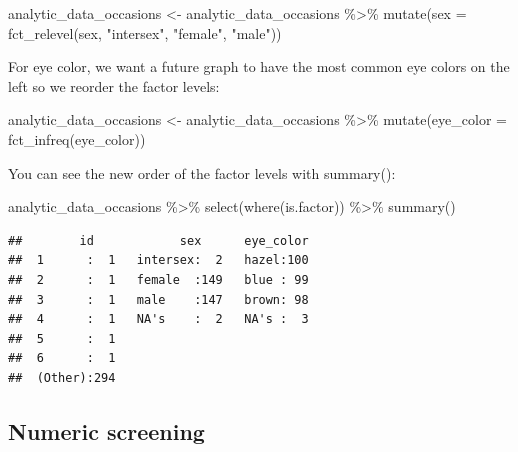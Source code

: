 \documentclass[
]{krantz}
\makeatletter
\newenvironment{Shaded}{\begin{snugshade}}{\end{snugshade}}
\newcommand{\AttributeTok}[1]{\textcolor[rgb]{0.61,0.61,0.61}{#1}}
\newcommand{\FunctionTok}[1]{\textcolor[rgb]{0,0,0}{#1}}
\newcommand{\NormalTok}[1]{#1}
\newcommand{\OtherTok}[1]{\textcolor[rgb]{0.37,0.37,0.37}{#1}}
\newcommand{\SpecialCharTok}[1]{\textcolor[rgb]{0,0,0}{#1}}
\newcommand{\StringTok}[1]{\textcolor[rgb]{0.5,0.5,0.5}{#1}}
\newenvironment{kframe}{%
\medskip{}
\setlength{\fboxsep}{.8em}
 \def\at@end@of@kframe{}%
 \ifinner\ifhmode%
  \def\at@end@of@kframe{\end{minipage}}%
  \begin{minipage}{\columnwidth}%
 \fi\fi%
 \def\FrameCommand##1{\hskip\@totalleftmargin \hskip-\fboxsep
 \colorbox{shadecolor}{##1}\hskip-\fboxsep
     \hskip-\linewidth \hskip-\@totalleftmargin \hskip\columnwidth}%
 \MakeFramed {\advance\hsize-\width
   \@totalleftmargin\z@ \linewidth\hsize
   \@setminipage}}%
 {\par\unskip\endMakeFramed%
 \at@end@of@kframe}
\renewenvironment{Shaded}{\begin{kframe}}{\end{kframe}}
\makeatother
\begin{document}
\begin{Shaded}
\begin{Highlighting}[]
\NormalTok{analytic\_data\_occasions }\OtherTok{\textless{}{-}}\NormalTok{ analytic\_data\_occasions }\SpecialCharTok{\%\textgreater{}\%}
  \FunctionTok{mutate}\NormalTok{(}\AttributeTok{sex =} \FunctionTok{fct\_relevel}\NormalTok{(sex,}
                           \StringTok{"intersex"}\NormalTok{,}
                           \StringTok{"female"}\NormalTok{,}
                           \StringTok{"male"}\NormalTok{))}
\end{Highlighting}
\end{Shaded}

For eye color, we want a future graph to have the most common eye colors on the left so we reorder the factor levels:

\begin{Shaded}
\begin{Highlighting}[]
\NormalTok{analytic\_data\_occasions }\OtherTok{\textless{}{-}}\NormalTok{ analytic\_data\_occasions }\SpecialCharTok{\%\textgreater{}\%}
  \FunctionTok{mutate}\NormalTok{(}\AttributeTok{eye\_color =} \FunctionTok{fct\_infreq}\NormalTok{(eye\_color))}
\end{Highlighting}
\end{Shaded}

You can see the new order of the factor levels with summary():

\begin{Shaded}
\begin{Highlighting}[]
\NormalTok{analytic\_data\_occasions }\SpecialCharTok{\%\textgreater{}\%}
  \FunctionTok{select}\NormalTok{(}\FunctionTok{where}\NormalTok{(is.factor)) }\SpecialCharTok{\%\textgreater{}\%}
  \FunctionTok{summary}\NormalTok{()}
\end{Highlighting}
\end{Shaded}

\begin{verbatim}
##        id            sex      eye_color  
##  1      :  1   intersex:  2   hazel:100  
##  2      :  1   female  :149   blue : 99  
##  3      :  1   male    :147   brown: 98  
##  4      :  1   NA's    :  2   NA's :  3  
##  5      :  1                             
##  6      :  1                             
##  (Other):294
\end{verbatim}

\hypertarget{numeric-screening-6}{%
\subsection{Numeric screening}\label{numeric-screening-6}}
\end{document}
